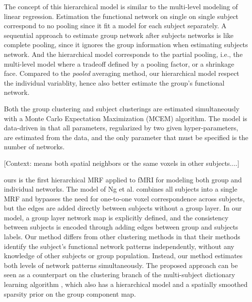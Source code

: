 \documentclass[12pt]{article}
\begin{document}
The concept of this hierarchical model is similar to the multi-level modeling of
linear regression. Estimation the functional network on single on single subject
correspond to no pooling since it fit a model for each subject separately. A
sequential approach to estimate group network after subjects networks is like
complete pooling, since it ignores the group information when estimating
subjects network. And the hierarchical model corresponds to the partial pooling,
i.e., the multi-level model where a tradeoff defined by a pooling factor, or a
shrinkage face. Compared to the \emph{pooled} averaging method, our hierarchical
model respect the individual variablity, hence also better estimate the group's
functional network.

Both the group clustering and subject clusterings are estimated simultaneously
with a Monte Carlo Expectation Maximization (MCEM) algorithm.  The model is
data-driven in that all parameters, regularized by two given hyper-parameters,
are estimated from the data, and the only parameter that must be specified is
the number of networks.


[Context: means both spatial neighbors or the same voxels in other subjects....]

ours is the first hierarchical MRF applied to fMRI for modeling both
group and individual networks. The model of Ng et al. \cite{ng2010group}
combines all subjects into a single MRF and bypasses the need for one-to-one
voxel correspondence across subjects, but the edges are added directly between
subjects without a group layer. In our model, a group layer network map is
explicitly defined, and the consistency between subjects is encoded through
adding edges between group and subjects labels. Our method differs from other
clustering methods \cite{bellec2010multi,van2008normalized} in that their
methods identify the subject's functional network patterns independently,
without any knowledge of other subjects or group population. Instead, our method
estimates both levels of network patterns simultaneously.  The proposed approach
can be seen as a counterpart on the clustering branch of the multi-subject
dictionary learning algorithm \cite{varoquaux2011multi}, which also has a
hierarchical model and a spatially smoothed sparsity prior on the group
component map.
\end{document}
